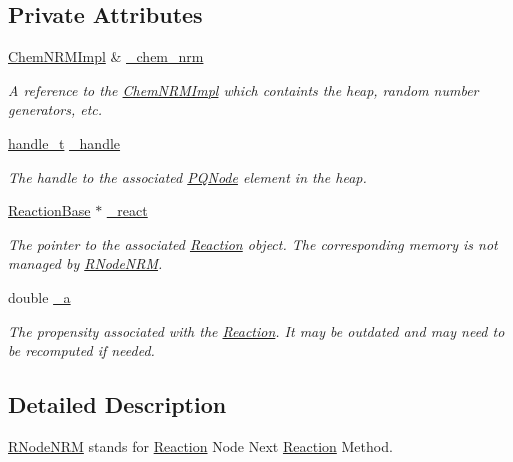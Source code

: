 \subsection*{Private Attributes}
\begin{DoxyCompactItemize}
\item 
\hyperlink{classchem_1_1ChemNRMImpl}{Chem\-N\-R\-M\-Impl} \& \hyperlink{classchem_1_1RNodeNRM_acff43a1b27a778b6534bd8010904f821}{\-\_\-chem\-\_\-nrm}
\begin{DoxyCompactList}\small\item\em A reference to the \hyperlink{classchem_1_1ChemNRMImpl}{Chem\-N\-R\-M\-Impl} which containts the heap, random number generators, etc. \end{DoxyCompactList}\item 
\hyperlink{namespacechem_a33be80d87771bff54f5cede2e5d81cd1}{handle\-\_\-t} \hyperlink{classchem_1_1RNodeNRM_ad124c85b0f1b479cf0c1f4bf75230c19}{\-\_\-handle}
\begin{DoxyCompactList}\small\item\em The handle to the associated \hyperlink{classchem_1_1PQNode}{P\-Q\-Node} element in the heap. \end{DoxyCompactList}\item 
\hyperlink{classchem_1_1ReactionBase}{Reaction\-Base} $\ast$ \hyperlink{classchem_1_1RNodeNRM_add823fa4b223afe0d750ed731c827d07}{\-\_\-react}
\begin{DoxyCompactList}\small\item\em The pointer to the associated \hyperlink{classchem_1_1Reaction}{Reaction} object. The corresponding memory is not managed by \hyperlink{classchem_1_1RNodeNRM}{R\-Node\-N\-R\-M}. \end{DoxyCompactList}\item 
double \hyperlink{classchem_1_1RNodeNRM_ae16aa8e75649d855f4b6eae8b00ed1db}{\-\_\-a}
\begin{DoxyCompactList}\small\item\em The propensity associated with the \hyperlink{classchem_1_1Reaction}{Reaction}. It may be outdated and may need to be recomputed if needed. \end{DoxyCompactList}\end{DoxyCompactItemize}


\subsection{Detailed Description}
\hyperlink{classchem_1_1RNodeNRM}{R\-Node\-N\-R\-M} stands for \hyperlink{classchem_1_1Reaction}{Reaction} Node Next \hyperlink{classchem_1_1Reaction}{Reaction} Method. 

